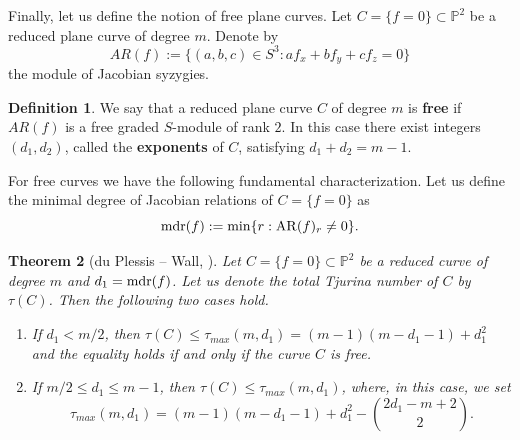 \documentclass[11pt]{article}
\theoremstyle{plain}
\newtheorem{theorem}{Theorem}[section]
\theoremstyle{definition}
\newtheorem{definition}[theorem]{Definition}
\theoremstyle{remark}
\begin{document}
Finally, let us define the notion of free plane curves.  Let $C = \{f = 0\} \subset \mathbb{P}^2$ be a reduced plane curve of degree $m$. Denote by
\[
AR(f) := \{(a,b,c) \in S^3 : af_x + bf_y + cf_z = 0\}
\]
the module of Jacobian syzygies.
\begin{definition}
We say that a reduced plane curve $C$ of degree $m$ is \textbf{free} if $AR(f)$ is a free graded $S$-module of rank $2$. In this case there exist integers $(d_1, d_2)$,
called the \textbf{exponents} of $C$, satisfying $d_1 + d_2 = m - 1$.
\end{definition}
For free curves we have the following fundamental characterization. Let us define the minimal degree of Jacobian relations of $C = \{f=0\}$ as
$${\rm mdr}(f) :={\rm min }\{r : {\rm AR}(f)_{r}\neq 0\}.$$
\begin{theorem}[{du Plessis -- Wall, \cite{DPP1}}]
\label{dup}
Let $C = \{f=0\}\subset \mathbb{P}^{2}$ be a reduced curve of degree $m$ and $d_1 = {\rm mdr}(f)$. Let us denote the total Tjurina number of $C$ by $\tau(C)$.
Then the following two cases hold.
\begin{enumerate}
\item[a)] If $d_1 < m/2$, then $\tau(C) \leq \tau_{max}(m,d_1 )= (m-1)(m-d_1-1)+d_{1}^2$ and the equality holds if and only if the curve $C$ is free.
\item[b)] If $m/2 \leq d_{1} \leq m-1$, then
$\tau(C) \leq \tau_{max}(m,d_{1})$,
where, in this case, we set
$$\tau_{max}(m,d_{1})=(m-1)(m-d_{1}-1)+d_{1}^2- \binom{2d_{1}-m+2}{2}.$$
\end{enumerate}
\end{theorem}
\end{document}
